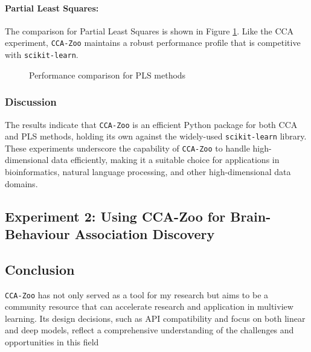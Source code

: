 \paragraph{Partial Least Squares:}
The comparison for Partial Least Squares is shown in Figure \ref{fig:pls_benchmark}.
Like the CCA experiment, \texttt{CCA-Zoo} maintains a robust performance profile that is competitive with \texttt{scikit-learn}.

\begin{figure}[h]
\centering

\caption{Performance comparison for PLS methods}
\label{fig:pls_benchmark}
\end{figure}

\subsubsection{Discussion}

The results indicate that \texttt{CCA-Zoo} is an efficient Python package for both CCA and PLS methods, holding its own against the widely-used \texttt{scikit-learn} library.
These experiments underscore the capability of \texttt{CCA-Zoo} to handle high-dimensional data efficiently, making it a suitable choice for applications in bioinformatics, natural language processing, and other high-dimensional data domains.



\subsection{Experiment 2: Using CCA-Zoo for Brain-Behaviour Association Discovery}

\subsection{Conclusion}

\texttt{CCA-Zoo} has not only served as a tool for my research but aims to be a community resource that can accelerate research and application in multiview learning.
Its design decisions, such as API compatibility and focus on both linear and deep models, reflect a comprehensive understanding of the challenges and opportunities in this field
